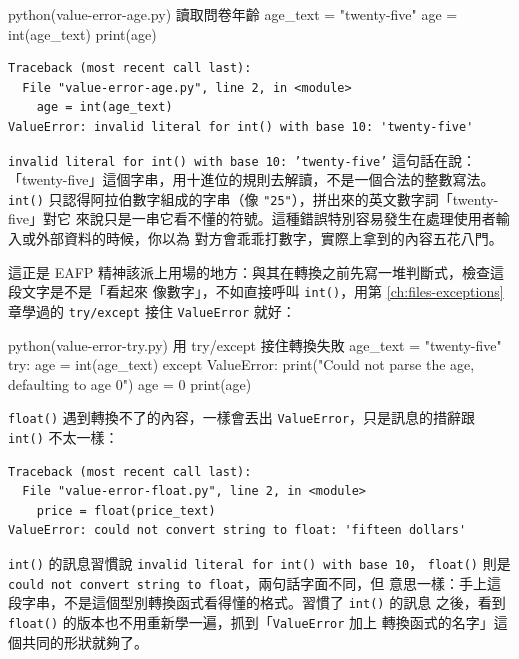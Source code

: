 \begin{example}{python}{(value-error-age.py) 讀取問卷年齡}
age_text = "twenty-five"
age = int(age_text)
print(age)
\end{example}

\begin{verbatim}
Traceback (most recent call last):
  File "value-error-age.py", line 2, in <module>
    age = int(age_text)
ValueError: invalid literal for int() with base 10: 'twenty-five'
\end{verbatim}

\texttt{invalid literal for int() with base 10: 'twenty-five'} 這句話在說：
「twenty-five」這個字串，用十進位的規則去解讀，不是一個合法的整數寫法。\texttt{int()}
只認得阿拉伯數字組成的字串（像 \texttt{"25"}），拼出來的英文數字詞「twenty-five」對它
來說只是一串它看不懂的符號。這種錯誤特別容易發生在處理使用者輸入或外部資料的時候，你以為
對方會乖乖打數字，實際上拿到的內容五花八門。

這正是 EAFP 精神該派上用場的地方：與其在轉換之前先寫一堆判斷式，檢查這段文字是不是「看起來
像數字」，不如直接呼叫 \texttt{int()}，用第 \ref{ch:files-exceptions} 章學過的 \texttt{try/except} 接住
\texttt{ValueError} 就好：

\begin{example}{python}{(value-error-try.py) 用 try/except 接住轉換失敗}
age_text = "twenty-five"
try:
    age = int(age_text)
except ValueError:
    print("Could not parse the age, defaulting to age 0")
    age = 0
print(age)
\end{example}


\texttt{float()} 遇到轉換不了的內容，一樣會丟出 \texttt{ValueError}，只是訊息的措辭跟
\texttt{int()} 不太一樣：

\begin{verbatim}
Traceback (most recent call last):
  File "value-error-float.py", line 2, in <module>
    price = float(price_text)
ValueError: could not convert string to float: 'fifteen dollars'
\end{verbatim}

\texttt{int()} 的訊息習慣說 \texttt{invalid literal for int() with base 10}，
\texttt{float()} 則是 \texttt{could not convert string to float}，兩句話字面不同，但
意思一樣：手上這段字串，不是這個型別轉換函式看得懂的格式。習慣了 \texttt{int()} 的訊息
之後，看到 \texttt{float()} 的版本也不用重新學一遍，抓到「\texttt{ValueError} 加上
轉換函式的名字」這個共同的形狀就夠了。

